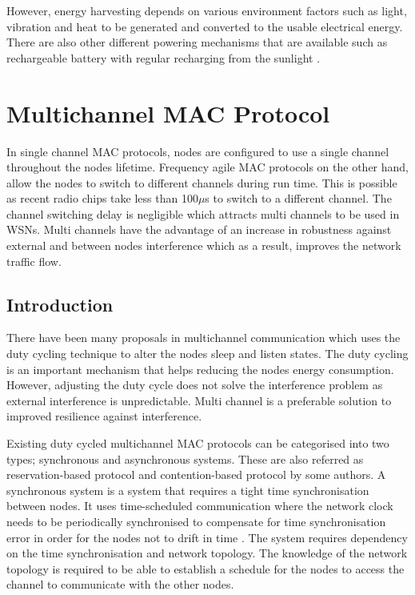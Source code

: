 However, energy harvesting depends on various environment factors such as light, vibration and heat to be generated and converted to the usable electrical energy. There are also other different powering mechanisms that are available such as rechargeable battery with regular recharging from the sunlight \cite{macsurvey}. 

\section{Multichannel MAC Protocol}
In single channel MAC protocols, nodes are configured to use a single channel throughout the nodes lifetime. Frequency agile MAC protocols on the other hand, allow the nodes to switch to different channels during run time. This is possible as recent radio chips take less than 100$\mu$s to switch to a different channel. The channel switching delay is negligible which attracts multi channels to be used in WSNs. Multi channels have the advantage of an increase in robustness against external and between nodes interference which as a result, improves the network traffic flow.


\subsection{Introduction}

There have been many proposals in multichannel communication which uses the duty cycling technique to alter the nodes sleep and listen states. The duty cycling is an important mechanism that helps reducing the nodes energy consumption. However, adjusting the duty cycle does not solve the interference problem as external interference is unpredictable. Multi channel is a preferable solution to improved resilience against interference.

Existing duty cycled multichannel MAC protocols can be categorised into two types; synchronous and asynchronous systems. These are also referred as reservation-based protocol and contention-based protocol by some authors. A synchronous system is a system that requires a tight time synchronisation between nodes. It uses time-scheduled communication where the network clock needs to be periodically synchronised to compensate for time synchronisation error in order for the nodes not to drift in time \cite{y-mac}. The system requires dependency on the time synchronisation and network topology. The knowledge of the network topology is required to be able to establish a schedule for the nodes to access the channel to communicate with the other nodes.


